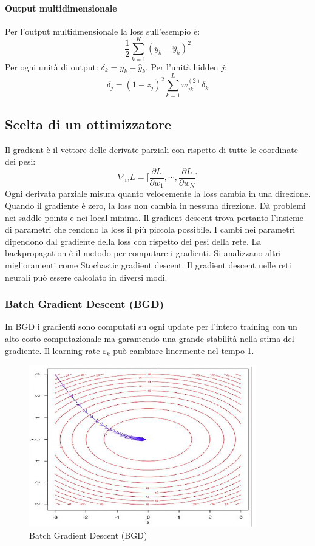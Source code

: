 			\paragraph{Output multidimensionale}
			Per l'output multidmensionale la loss sull'esempio \`e:
			$$\frac{1}{2}\sum\limits_{k = 1}^K(y_k-\hat{y}_k)^2$$
			Per ogni unit\`a di output: $\delta_k = y_k - \hat{y}_k$.
			Per l'unit\`a hidden $j$:
			$$\delta_j = (1-z_j)^2\sum\limits_{k=1}^Lw_{jk}^{(2)}\delta_k$$








	\subsection{Scelta di un ottimizzatore}
	Il gradient \`e il vettore delle derivate parziali con rispetto di tutte le coordinate dei pesi:
	$$\nabla_w L = \bigl[\frac{\partial L}{\partial w_1}, \cdots, \frac{\partial L}{\partial w_N}\bigr]$$
	Ogni derivata parziale misura quanto velocemente la loss cambia in una direzione.
	Quando il gradiente \`e zero, la loss non cambia in nessuna direzione.
	D\`a problemi nei saddle points e nei local minima.
	Il gradient descent trova pertanto l'insieme di parametri che rendono la loss il pi\`u piccola possibile.
	I cambi nei parametri dipendono dal gradiente della loss con rispetto dei pesi della rete.
	La backpropagation \`e il metodo per computare i gradienti.
	Si analizzano altri miglioramenti come Stochastic gradient descent.
	Il gradient descent nelle reti neurali pu\`o essere calcolato in diversi modi.

		\subsubsection{Batch Gradient Descent (BGD)}
		In BGD i gradienti sono computati su ogni update per l'intero training con un alto costo computazionale ma garantendo una grande stabilit\`a nella stima del gradiente.
		Il learning rate $\varepsilon_k$ pu\`o cambiare linermente nel tempo \ref{fig:chapter11-10}.\\
		
		
		\begin{figure}
			\centering
			\includegraphics[width=0.6\linewidth]{imgs/chapter11/img10}
			\caption{Batch Gradient Descent (BGD)}
			\label{fig:chapter11-10}
		\end{figure}


